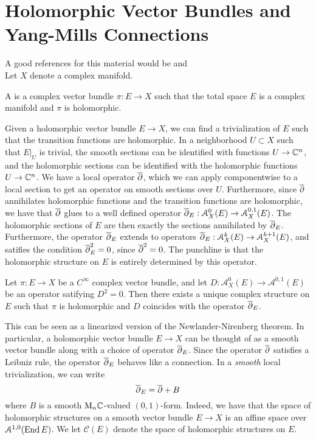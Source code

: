 %
\section{Holomorphic Vector Bundles and Yang-Mills Connections}
%
A good references for this material would be \cite{Kob} and \cite{McDuff}\\

Let $X$ denote a complex manifold.
%
\begin{defn}
A  is a complex vector bundle $\pi : E \to X$
such that the total space $E$ is a complex manifold and $\pi$ is holomorphic.
\end{defn}
%
Given a holomorphic vector bundle $E \to X$, we can find a trivialization
of $E$ such that the transition functions are holomorphic. In a neighborhood
$U \subset X$ such that $E\vert_U$ is trivial, the smooth sections can
be identified with functions $U \to \mathbb{C}^n$, and the holomorphic sections
can be identified with the holomorphic functions $U \to \mathbb{C}^n$. We
have a local operator $\overline{\partial}$, which we can apply componentwise to a local
section to get an operator on smooth sections over $U$. Furthermore, since
$\overline{\partial}$ annihilates holomorphic functions and the transition functions
are holomorphic, we have that $\overline{\partial}$ glues to a well defined operator
$\overline{\partial}_E : \mathcal{A}^0_X(E) \to \mathcal{A}^{0,1}_X(E)$. The holomorphic sections of $E$
are then exactly the sections annihilated by $\overline{\partial}_E$. Furthermore, the operator
$\overline{\partial}_E$ extends to operators $\overline{\partial}_E : \mathcal{A}^k_X(E) \to \mathcal{A}^{k+1}_X(E)$,
and satifies the condition $\overline{\partial}_E^2 = 0$, since $\overline{\partial}^2 = 0$. The punchline
is that the holomorphic structure on $E$ is entirely determined by this operator.
%
\begin{thm}
Let $\pi : E \to X$ be a $C^\infty$ complex vector bundle, and let
$D : \mathcal{A}^0_X(E) \to \mathcal{A}^{0,1}(E)$ be an operator satifying
$D^2 = 0$. Then there exists a unique complex structure on $E$
such that $\pi$ is holomorphic and $D$ coincides with the operator $\overline{\partial}_E$.
\end{thm}
%
This can be seen as a linearized version of the Newlander-Nirenberg theorem.
In particular, a holomorphic vector bundle $E \to X$ can be thought
of as a smooth vector bundle along with a choice of operator $\overline{\partial}_E$.
Since the operator $\overline{\partial}$ satisfies a Leibniz rule, the operator $\overline{\partial}_E$
behaves like a connection. In a \emph{smooth} local trivialization,
we can write
\[
\overline{\partial}_E = \overline{\partial} + B
\]
where $B$ is a smooth $\mathrm{M}_n\mathbb{C}$-valued $(0,1)$-form. Indeed,
we have that the space of holomorphic structures on a smooth vector bundle
$E \to X$ is an affine space over $\mathcal{A}^{1,0}(\operatorname{End} E)$. We
let $\mathscr{C}(E)$ denote the space of holomorphic structures on $E$.\\

